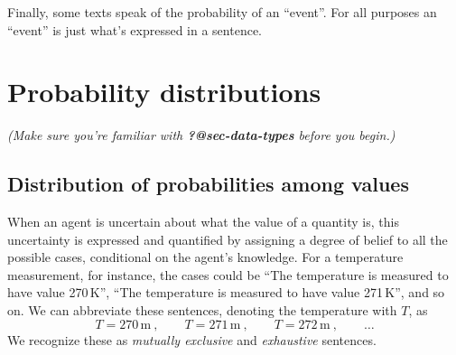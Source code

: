 \documentclass[
  a4paper,
  DIV=11,
  numbers=noendperiod,
  oneside]{scrreprt}
\begin{document}
Finally, some texts speak of the probability of an ``event''. For all
purposes an ``event'' is just what's expressed in a sentence.

\hypertarget{probability-distributions}{%
\chapter{Probability distributions}\label{probability-distributions}}

\providecommand{\ul}{\uline}
\renewcommand*{\|}[1][]{\nonscript\:#1\vert\nonscript\:\mathopen{}}
\providecommand*{\pr}[1]{\textsf{\small`#1'}}
\renewcommand*{\pr}[1]{\textsf{\small`#1'}}
\providecommand*{\prq}[1]{\textsf{\small #1}}

\providecommand{\se}[1]{\mathsfit{#1}}
\renewcommand{\se}[1]{\mathsfit{#1}}
\providecommand{\p}{\mathrm{p}}
\renewcommand{\p}{\mathrm{p}}
\renewcommand{\P}{\mathrm{P}}

\providecommand*{\mo}[1][=]{\mathord{\,#1\,}}
\providecommand*{\yX}{\se{X}}
\providecommand*{\yY}{\se{Y}}
\providecommand*{\yI}{\se{I}}
\providecommand{\di}{\mathrm{d}}

{\emph{(Make sure you're familiar with \textbf{?@sec-data-types} before
you begin.)}}

\hypertarget{distribution-of-probabilities-among-values}{%
\section{Distribution of probabilities among
values}\label{distribution-of-probabilities-among-values}}

When an agent is uncertain about what the value of a quantity is, this
uncertainty is expressed and quantified by assigning a degree of belief
to all the possible cases, conditional on the agent's knowledge. For a
temperature measurement, for instance, the cases could be ``{The
temperature is measured to have value 270\,K}'', ``{The temperature is
measured to have value 271\,K}'', and so on. We can abbreviate these
sentences, denoting the temperature with \(T\), as \[
T = 270\,\mathrm{m} \ , \qquad
T = 271\,\mathrm{m} \ , \qquad
T = 272\,\mathrm{m} \ , \qquad
\dotsc
\] We recognize these as \emph{mutually exclusive} and \emph{exhaustive}
sentences.
\end{document}
